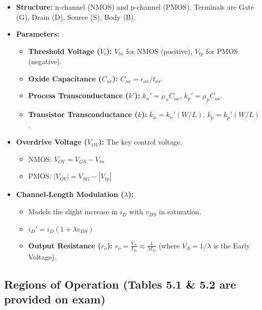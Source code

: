 \documentclass[12pt, letterpaper]{article}
\begin{document}
\begin{itemize}
    \item \textbf{Structure:} n-channel (NMOS) and p-channel (PMOS). Terminals are Gate (G), Drain (D), Source (S), Body (B).
    \item \textbf{Parameters:}
    \begin{itemize}
        \item \textbf{Threshold Voltage ($V_t$):} $V_{tn}$ for NMOS (positive), $V_{tp}$ for PMOS (negative).
        \item \textbf{Oxide Capacitance ($C_{ox}$):} $C_{ox} = \epsilon_{ox} / t_{ox}$.
        \item \textbf{Process Transconductance ($k'$):} $k_n' = \mu_n C_{ox}$, $k_p' = \mu_p C_{ox}$.
        \item \textbf{Transistor Transconductance ($k$):} $k_n = k_n'(W/L)$, $k_p = k_p'(W/L)$.
    \end{itemize}
    \item \textbf{Overdrive Voltage ($V_{OV}$):} The key control voltage.
    \begin{itemize}
        \item NMOS: $V_{OV} = V_{GS} - V_{tn}$
        \item PMOS: $|V_{OV}| = V_{SG} - |V_{tp}|$
    \end{itemize}
    \item \textbf{Channel-Length Modulation ($\lambda$):}
    \begin{itemize}
        \item Models the slight increase in $i_D$ with $v_{DS}$ in saturation.
        \item $i_D' = i_D (1 + \lambda v_{DS})$
        \item \textbf{Output Resistance ($r_o$):} $r_o = \frac{V_A}{I_D} \approx \frac{1}{\lambda I_D}$ (where $V_A = 1/\lambda$ is the Early Voltage).
    \end{itemize}
\end{itemize}

\subsection*{Regions of Operation (Tables 5.1 \& 5.2 are provided on exam)}
\end{document}
